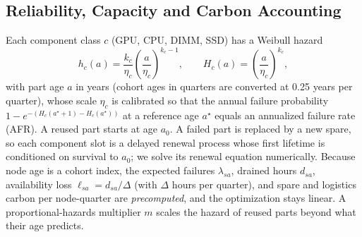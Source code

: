 \documentclass[11pt]{article}
\begin{document}
\subsection{Reliability, Capacity and Carbon Accounting}
Each component class $c$ (GPU, CPU, DIMM, SSD) has a Weibull hazard
\begin{equation}
h_c(a)=\frac{k_c}{\eta_c}\left(\frac{a}{\eta_c}\right)^{k_c-1},\qquad H_c(a)=\left(\frac{a}{\eta_c}\right)^{k_c},
\label{eq:weibull}
\end{equation}
with part age $a$ in years (cohort ages in quarters are converted at 0.25 years per quarter), whose scale $\eta_c$ is calibrated so that the annual failure probability $1-e^{-(H_c(a^\star+1)-H_c(a^\star))}$ at a reference age $a^\star$ equals an annualized failure rate (AFR). A reused part starts at age $a_0$. A failed part is replaced by a new spare, so each component slot is a delayed renewal process whose first lifetime is conditioned on survival to $a_0$; we solve its renewal equation numerically. Because node age is a cohort index, the expected failures $\lambda_{sa}$, drained hours $d_{sa}$, availability loss $\ell_{sa}=d_{sa}/\Delta$ (with $\Delta$ hours per quarter), and spare and logistics carbon per node-quarter are \emph{precomputed}, and the optimization stays linear. A proportional-hazards multiplier $m$ scales the hazard of reused parts beyond what their age predicts.
\end{document}

